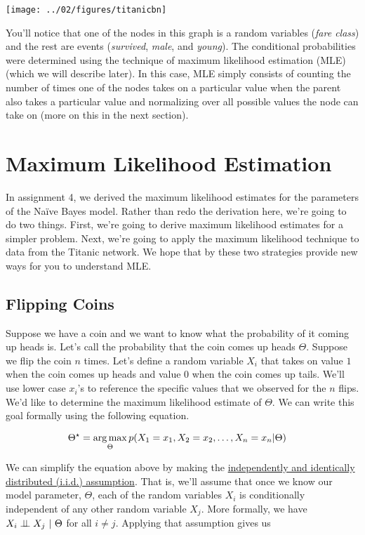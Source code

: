 \documentclass{tufte-handout}
\begin{document}
\begin{center}
\texttt{[image: ../02/figures/titanicbn]}
\end{center}

You'll notice that one of the nodes in this graph is a random variables (\emph{fare class}) and the rest are events (\emph{survived}, \emph{male}, and \emph{young}).  The conditional probabilities were determined using the technique of maximum likelihood estimation (MLE) (which we will describe later).  In this case, MLE simply consists of counting the number of times one of the nodes takes on a particular value when the parent also takes a particular value and normalizing over all possible values the node can take on (more on this in the next section).

\section{Maximum Likelihood Estimation}

In assignment 4, we derived the maximum likelihood estimates for the parameters of the Na\"ive Bayes model.  Rather than redo the derivation here, we're going to do two things.  First, we're going to derive maximum likelihood estimates for a simpler problem.  Next, we're going to apply the maximum likelihood technique to data from the Titanic network.  We hope that by these two strategies provide new ways for you to understand MLE.

\subsection{Flipping Coins}

Suppose we have a coin and we want to know what the probability of it coming up heads is.  Let's call the probability that the coin comes up heads $\Theta$.  Suppose we flip the coin $n$ times.  Let's define a random variable $X_i$ that takes on value $1$ when the coin comes up heads and value $0$ when the coin comes up tails.  We'll use lower case $x_i$'s to reference the specific values that we observed for the $n$ flips.  We'd like to determine the maximum likelihood estimate of $\Theta$.  We can write this goal formally using the following equation.


\begin{align}
\Theta^\star &= \operatorname*{arg\,max}_{\Theta} p(X_1 = x_1, X_2 = x_2, \ldots, X_n = x_n | \Theta)
\end{align} 

We can simplify the equation above by making the \href{https://en.wikipedia.org/wiki/Independent_and_identically_distributed_random_variables}{independently and identically distributed (i.i.d.) assumption}.  That is, we'll assume that once we know our model parameter, $\Theta$, each of the random variables $X_i$ is conditionally independent of any other random variable $X_j$.  More formally, we have $X_i \perp\!\!\!\perp X_j~|~\Theta$ for all $i \neq j$.  Applying that assumption gives us
\end{document}
